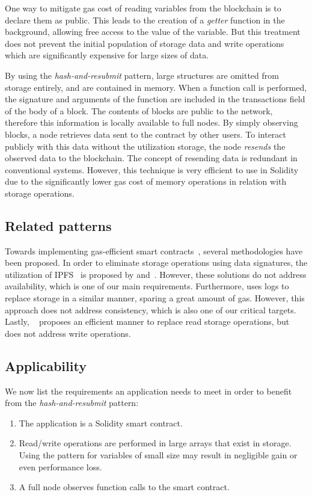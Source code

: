 One way to mitigate gas cost of reading variables
from the blockchain is to declare them as public. This leads to the creation of a
\emph{getter} function in the background, allowing free access to the value of
the variable. But this treatment does not prevent the initial population of
storage data and write operations which are significantly expensive for large
sizes of data.

By using the \emph{hash-and-resubmit} pattern, large structures are omitted
from storage entirely, and are contained in memory. When a function call is
performed, the signature and arguments of the function are included in the
transactions field of the body of a block. The contents of blocks are public to
the network, therefore this information is locally available to full nodes. By
simply observing blocks, a node retrieves data sent to the contract by other
users. To interact publicly with this data without the utilization storage, the
node \emph{resends} the observed data to the blockchain. The concept of
resending data is redundant in conventional systems. However, this technique
is very efficient to use in Solidity due to the significantly lower gas cost
of memory operations in relation with storage operations.

\subsection{Related patterns} Towards implementing gas-efficient smart
contracts~\cite{contract-opt-1, contract-opt-2, slither, madmax}, several
methodologies have been proposed. In order to eliminate storage operations
using data signatures, the utilization of IPFS~\cite{ipfs} is proposed by
\cite{ipfs-1} and~\cite{ipfs-2}. However, these solutions do not address
availability, which is one of our main requirements. Furthermore,
\cite{logs} uses logs to replace storage in a similar manner, sparing a great
amount of gas. However, this approach does not address consistency, which is
also one of our critical targets. Lastly, ~\cite{memory-array} proposes an
efficient manner to replace read storage operations, but does not address write
operations.

\subsection{Applicability}
We now list the requirements an application needs to meet in order to benefit
from the \emph{hash-and-resubmit} pattern:

\begin{enumerate}
    \item The application is a Solidity smart contract.
    \item Read/write operations are performed in large arrays that exist in
        storage. Using the pattern for variables of small size may result in
        negligible gain or even performance loss.
    \item A full node observes function calls to the smart contract.
\end{enumerate}

